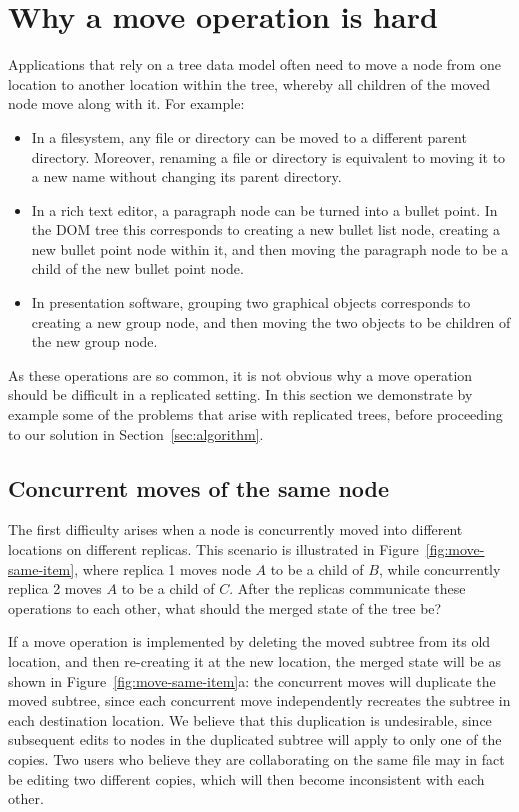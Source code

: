 \documentclass[sigconf]{acmart}
\begin{document}
\section{Why a move operation is hard}\label{sec:move-is-hard}

Applications that rely on a tree data model often need to move a node from one location to another location within the tree, whereby all children of the moved node move along with it.
For example:
\begin{itemize}
    \item In a filesystem, any file or directory can be moved to a different parent directory.
        Moreover, renaming a file or directory is equivalent to moving it to a new name without changing its parent directory.
    \item In a rich text editor, a paragraph node can be turned into a bullet point.
        In the DOM tree this corresponds to creating a new bullet list node, creating a new bullet point node within it, and then moving the paragraph node to be a child of the new bullet point node.
    \item In presentation software, grouping two graphical objects corresponds to creating a new group node, and then moving the two objects to be children of the new group node.
\end{itemize}
As these operations are so common, it is not obvious why a move operation should be difficult in a replicated setting.
In this section we demonstrate by example some of the problems that arise with replicated trees, before proceeding to our solution in Section~\ref{sec:algorithm}.

\subsection{Concurrent moves of the same node}\label{sec:move-same-item}

The first difficulty arises when a node is concurrently moved into different locations on different replicas.
This scenario is illustrated in Figure~\ref{fig:move-same-item}, where replica 1 moves node $A$ to be a child of $B$, while concurrently replica 2 moves $A$ to be a child of $C$.
After the replicas communicate these operations to each other, what should the merged state of the tree be?

If a move operation is implemented by deleting the moved subtree from its old location, and then re-creating it at the new location, the merged state will be as shown in Figure~\ref{fig:move-same-item}a: the concurrent moves will duplicate the moved subtree, since each concurrent move independently recreates the subtree in each destination location.
We believe that this duplication is undesirable, since subsequent edits to nodes in the duplicated subtree will apply to only one of the copies.
Two users who believe they are collaborating on the same file may in fact be editing two different copies, which will then become inconsistent with each other.
\end{document}
